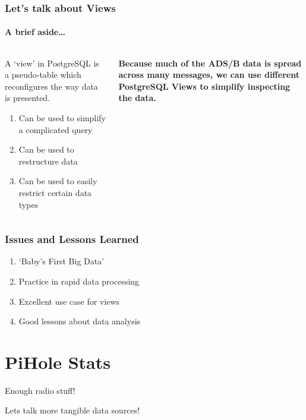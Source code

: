 \documentclass[aspectratio=169]{beamer}
\begin{document}
\begin{frame}
  \frametitle{Let's talk about Views}
  \framesubtitle{A brief aside\dots}
  \begin{columns}[T]
    \begin{column}[T]{0.5\paperwidth}
      A `view' in PostgreSQL is a pseudo-table which reconfigures the way data
      is presented.
      \begin{enumerate}
        \item{Can be used to simplify a complicated query}
        \item{Can be used to restructure data}
        \item{Can be used to easily restrict certain data types}
      \end{enumerate}
    \end{column}
    \begin{column}[T]{0.45\paperwidth}
      \textbf{Because much of the ADS/B data is spread across many messages, we can use
      different PostgreSQL Views to simplify inspecting the data.}
    \end{column}
  \end{columns}
\end{frame}

\begin{frame}[fragile]
  \frametitle{Issues and Lessons Learned}
  \begin{enumerate}
    \item{`Baby's First Big Data'}
    \item{Practice in rapid data processing}
    \item{Excellent use case for views}
    \item{Good lessons about data analysis}
  \end{enumerate}
\end{frame}

\section{PiHole Stats}
\begin{frame}[plain]
  \begin{center}
  \LARGE{Enough radio stuff!

  Lets talk more tangible data sources!}
  \end{center}
\end{frame}

\frame{\sectionpage}
\end{document}
